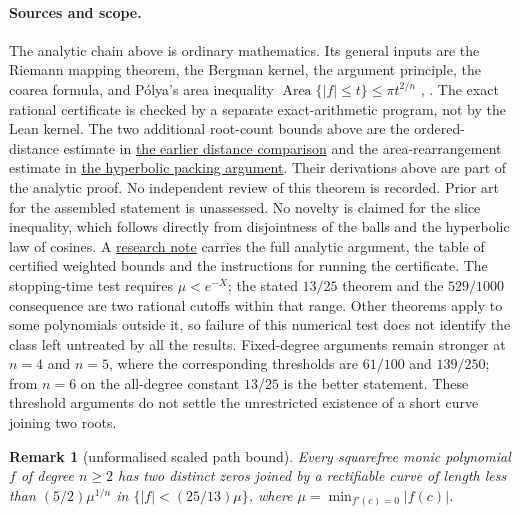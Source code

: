 \documentclass[11pt]{article}
\newtheorem{remark}[theorem]{Remark}
\begin{document}
\paragraph{Sources and scope.}
\label{bdry:low-critical-closure}
The analytic chain above is ordinary mathematics.  Its general inputs are the
Riemann mapping theorem, the Bergman kernel, the argument principle, the
coarea formula, and P\'olya's area inequality
$\operatorname{Area}\{|f|\le t\}\le\pi t^{2/n}$
\cite[printed pp.~280--282]{polya1928}, \cite[Theorem~1]{crane}.  The exact
rational certificate is checked by a separate exact-arithmetic program,
not by the Lean kernel. The two additional root-count bounds above are
the ordered-distance estimate in
\href{https://github.com/wcook04/plectis-erdos/blob/f36a98bf3d3e6f65f1074e3b800e3293d5b8a51a/ErdosProblems/Erdos1041/ClusterSeparationLowCriticalClosure.md}{the earlier distance comparison}
and the area-rearrangement estimate in
\href{https://github.com/wcook04/plectis-erdos/blob/f36a98bf3d3e6f65f1074e3b800e3293d5b8a51a/ErdosProblems/Erdos1041/HyperbolicPackingArityFloor.md}{the hyperbolic packing argument}.
Their derivations above are part of the analytic proof. No independent
review of this theorem is recorded. Prior art for
the assembled statement is unassessed. No novelty is claimed for the
slice inequality, which follows directly from disjointness of the balls
and the hyperbolic law of cosines.  A
\href{https://github.com/wcook04/plectis-erdos/blob/f36a98bf3d3e6f65f1074e3b800e3293d5b8a51a/ErdosProblems/Erdos1041/AngularBudgetLowCriticalClosure.md}{research note}
carries the full analytic argument, the table of certified weighted bounds
and the instructions for running the certificate. The stopping-time test
requires $\mu<e^{-X}$; the stated $13/25$ theorem and the $529/1000$
consequence are two rational cutoffs within that range. Other theorems
apply to some polynomials outside it, so failure of this numerical test
does not identify the class left untreated by all the results.
Fixed-degree arguments remain stronger at $n=4$ and $n=5$, where the
corresponding thresholds are $61/100$ and $139/250$; from $n=6$ on the
all-degree constant $13/25$ is the better statement.  These threshold
arguments do not settle the unrestricted existence of a short curve joining two roots.

\begin{remark}[unformalised scaled path bound]\label{res:scaled-low-critical-path}
Every squarefree monic polynomial $f$ of degree $n\ge2$ has two distinct
zeros joined by a rectifiable curve of length less than
$(5/2)\mu^{1/n}$ in $\{|f|<(25/13)\mu\}$, where
$\mu=\min_{f'(c)=0}|f(c)|$.
\end{remark}
\end{document}
